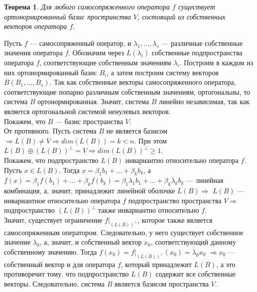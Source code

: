 \newtheorem*{th14_6_2}{Теорема}\begin{th14_6_2}Для любого самосопряженного оператора $f$ существует ортонормированный базис пространства $V$, состоящий из собственных векторов оператора $f$.
\end{th14_6_2}\begin{Proof}
	Пусть $f$ --- самосопряженный оператор, и $\lambda_1, \dots, \lambda_s$ --- различные собственные значения оператора $f$. Обозначим через $L(\lambda_i)$ собственные подпространства оператора $f$, соответствующие собственным значениям $\lambda_i$. Построим в каждом из них ортонормированный базис $B_i$, а затем построим систему векторов $B(B_1, \dots, B_s)$. Так как собственные векторы самосопряженного оператора, соответствующие попарно различным собственным значениям, ортогональны, то система $B$ ортонормированная. Значит, система $B$ линейно независимая, так как является ортогональной системой ненулевых векторов. \\Покажем, что $B$ --- базис пространства $V$.\\ От противного. Пусть система $B$ не является базисом $\Rightarrow L(B) \ne V \Rightarrow dim(L(B)) = k < n$. При этом $L(B) \oplus (L(B))^\perp = V \Rightarrow dim(L(B))^\perp\geqslant 1$.\\
	Покажем, что подпространство $L(B)$ инвариантно относительно оператора $f$. Пусть $x \in L(B)$. Тогда $x = \beta_1b_1 + \ldots + \beta_kb_k$, а $f(x) = \beta_1f(b_1) + \ldots + \beta_kf(b_k) = \beta_1\lambda_1b_1 + \ldots + \beta_k\lambda_kb_k$ --- линейная комбинация, а, значит, принадлежит линейной оболочке $L(B)\Rightarrow$ $L(B)$ --- инвариантное относительно оператора $f$ подпространство пространства $V \Rightarrow$ подпространство $(L(B))^\perp$ также инвариантно относительно $f$.\\		
	Значит, существует ограничение $f|_{(L(B))^\perp}$, которое также является самосопряженным оператором. Следовательно, у него существует собственное значение $\lambda_0$, а, значит, и собственный вектор $x_0$, соответствующий данному собственному значению. Тогда $f(x_0) = f|_{(L(B))^\perp}(x_0) = \lambda_0x_0$ $\Rightarrow x_0 $ --- собственный вектор и для оператора $f$, который принадлежит $L(B)$, а это противоречит тому, что подпространство $L(B)$ содержит все собственные векторы. Следовательно, система $B$ является базисом пространства $V$.
\end{Proof}






